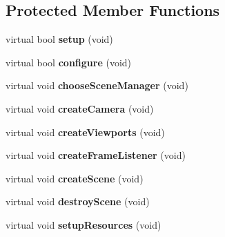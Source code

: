 \subsection*{Protected Member Functions}
\begin{DoxyCompactItemize}
\item 
virtual bool {\bfseries setup} (void)\hypertarget{class_base_fight_window_a81fce8d7527380754186bb3998e0fe49}{}\label{class_base_fight_window_a81fce8d7527380754186bb3998e0fe49}

\item 
virtual bool {\bfseries configure} (void)\hypertarget{class_base_fight_window_ab98a6275e5ebd77c6d2a80bb5d25113d}{}\label{class_base_fight_window_ab98a6275e5ebd77c6d2a80bb5d25113d}

\item 
virtual void {\bfseries choose\+Scene\+Manager} (void)\hypertarget{class_base_fight_window_a296c3b8f1e5fbcda188c57f11a58b372}{}\label{class_base_fight_window_a296c3b8f1e5fbcda188c57f11a58b372}

\item 
virtual void {\bfseries create\+Camera} (void)\hypertarget{class_base_fight_window_a42da2bf7155a2282548a02f5b73d8b2f}{}\label{class_base_fight_window_a42da2bf7155a2282548a02f5b73d8b2f}

\item 
virtual void {\bfseries create\+Viewports} (void)\hypertarget{class_base_fight_window_a5f69a1df0cf2548031ea86156e78eed2}{}\label{class_base_fight_window_a5f69a1df0cf2548031ea86156e78eed2}

\item 
virtual void {\bfseries create\+Frame\+Listener} (void)\hypertarget{class_base_fight_window_a5d0e379fdf038df6a7392da19fb34b35}{}\label{class_base_fight_window_a5d0e379fdf038df6a7392da19fb34b35}

\item 
virtual void {\bfseries create\+Scene} (void)\hypertarget{class_base_fight_window_ad99714313b26a56d37af3fd9e3a40356}{}\label{class_base_fight_window_ad99714313b26a56d37af3fd9e3a40356}

\item 
virtual void {\bfseries destroy\+Scene} (void)\hypertarget{class_base_fight_window_a507ac61c85648bb5bbb67e3d29f35e29}{}\label{class_base_fight_window_a507ac61c85648bb5bbb67e3d29f35e29}

\item 
virtual void {\bfseries setup\+Resources} (void)\hypertarget{class_base_fight_window_a7d6aa85ec7c6cae5a47792607120fdf8}{}\label{class_base_fight_window_a7d6aa85ec7c6cae5a47792607120fdf8}


\end{DoxyCompactItemize}
